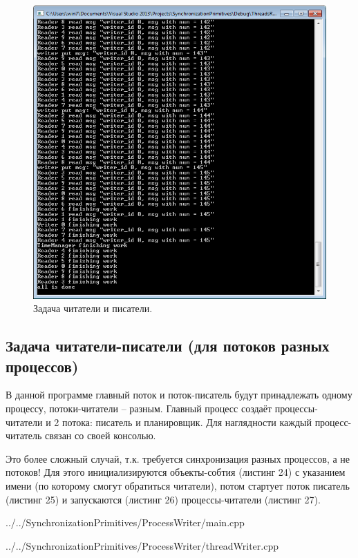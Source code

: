 \documentclass[a4paper, 12pt]{article}		%
\begin{document}
\begin{figure}[h!]
\centering
\includegraphics[scale=1]{res/006}
\caption{Задача читатели и писатели.}
\end{figure}


\newpage
\subsection{Задача читатели-писатели (для потоков разных процессов)}

В данной программе главный поток и поток-писатель будут принадлежать одному процессу, потоки-читатели – разным. Главный процесс создаёт процессы-читатели и 2 потока: писатель и планировщик. Для наглядности каждый процесс-читатель связан со своей консолью.

Это более сложный случай, т.к. требуется синхронизация разных процессов, а не потоков! Для этого инициализируются объекты-собтия (листинг 24) с указанием имени (по которому смогут обратиться читатели), потом стартует поток писатель (листинг 25) и запускаются (листинг 26) процессы-читатели (листинг 27).


{../../SynchronizationPrimitives/ProcessWriter/main.cpp}


{../../SynchronizationPrimitives/ProcessWriter/threadWriter.cpp}
\newpage
\end{document}
